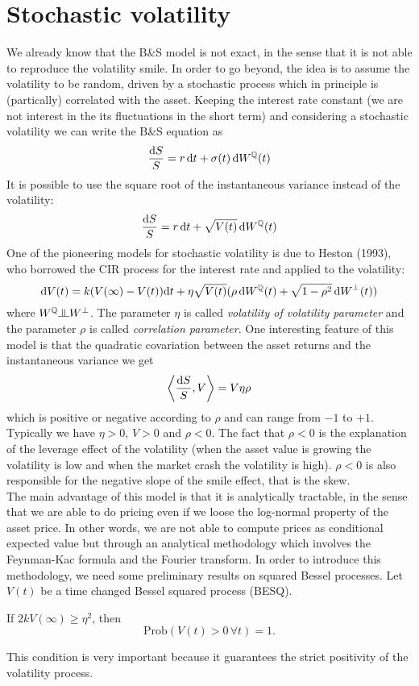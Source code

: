 \section{Stochastic volatility}
We already know that the B\&S model is not exact, in the sense that it is not able to reproduce the volatility smile. In order to go beyond, the idea is to assume the volatility to be random, driven by a stochastic process which in principle is (partically) correlated with the asset. Keeping the interest rate constant (we are not interest in the its fluctuations in the short term) and considering a stochastic volatility we can write the B\&S equation as
\begin{equation}
    \frac{\dd S}{S} = r\,\dd t + \sigma(t)\,\dd W^{\mathbb{Q}}(t)
\end{equation}
It is possible to use the square root of the instantaneous variance instead of the volatility:
\begin{equation}
    \frac{\dd S}{S} = r\,\dd t + \sqrt{V(t)}\,\dd W^{\mathbb{Q}}(t)
\end{equation}
One of the pioneering models for stochastic volatility is due to Heston (1993), who borrowed the CIR process for the interest rate and applied to the volatility:
\begin{equation}
    \dd V(t) = k(V(\infty)-V(t))\dd t + \eta\sqrt{V(t)}(\rho\,\dd W^{\mathbb{Q}}(t) + \sqrt{1-\rho^2}\,\dd W^{\perp}(t))
\end{equation}%
where $W^{\Qmeas}\indep W^{\perp}$. The parameter $\eta$ is called \emph{volatility of volatility parameter} and the parameter $\rho$ is called \emph{correlation parameter}. One interesting feature of this model is that the quadratic covariation between the asset returns and the instantaneous variance we get
\begin{equation*}
    \expval{\frac{\dd S}{S}, V} = V\eta\rho
\end{equation*}
which is positive or negative according to $\rho$ and can range from $-1$ to $+1$. Typically we have $\eta>0$, $V>0$ and $\rho<0$. The fact that $\rho<0$ is the explanation of the leverage effect of the volatility (when the asset value is growing the volatility is low and when the market crash the volatility is high). $\rho<0$ is also responsible for the negative slope of the smile effect, that is the skew. \\ %
The main advantage of this model is that it is analytically tractable, in the sense that we are able to do pricing even if we loose the log-normal property of the asset price. In other words, we are not able to compute prices as conditional expected value but through an analytical methodology which involves the Feynman-Kac formula and the Fourier transform. In order to introduce this methodology, we need some preliminary results on squared Bessel processes. Let $V(t)$ be a time changed Bessel squared process (BESQ).
\begin{proposition}
    If $2kV(\infty) \ge \eta^2$, then
    \begin{equation*}
        \text{Prob}(V(t)>0\,\forall t) = 1.
    \end{equation*}
\end{proposition}
This condition is very important because it guarantees the strict positivity of the volatility process.
